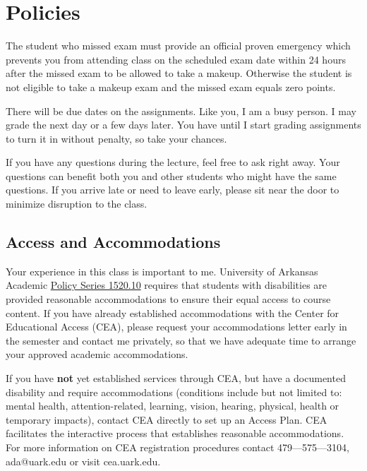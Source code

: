 \documentclass[12pt]{article}
\begin{document}
\section*{Policies}

The student who missed exam must provide an official proven emergency which prevents you from attending class on the scheduled exam date within 24 hours after the missed exam to be allowed to take a makeup. Otherwise the student is not eligible to take a makeup exam and the missed exam equals zero points.

There will be due dates on the assignments. Like you, I am a busy person. I may grade the next day or a few days later. You have until I start grading assignments to turn it in without penalty, so take your chances. 

If you have any questions during the lecture, feel free to ask right away. Your questions can benefit both you and other students who might have the same questions. If you arrive late or need to leave early, please sit near the door to minimize disruption to the class.

\subsection*{Access and Accommodations}

Your experience in this class is important to me. University of Arkansas Academic \href{https://policies.uark.edu/academic/152010.php}{Policy Series 1520.10} requires that students with disabilities are provided reasonable accommodations to ensure their equal access to course content. If you have already established accommodations with the Center for Educational Access (CEA), please request your accommodations letter early in the semester and contact me privately, so that we have adequate time to arrange your approved academic accommodations.

If you have \textbf{not} yet established services through CEA, but have a documented disability and require accommodations (conditions include but not limited to: mental health, attention-related, learning, vision, hearing, physical, health  or temporary impacts), contact CEA directly to set up an Access Plan. CEA facilitates the interactive process that establishes reasonable accommodations.  For more information on CEA registration procedures contact 479—575—3104, ada@uark.edu or visit cea.uark.edu.

\end{document}
